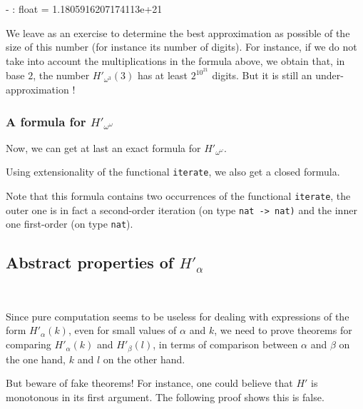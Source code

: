 \begin{Coqanswer}
- : float = 1.1805916207174113e+21
\end{Coqanswer}




We leave as an exercise to determine the best approximation as possible of
 the size of this number (for instance its number of digits).  For instance, if
we do not take into account the multiplications in the formula above,
we obtain that, in base $2$, the number $H'_{\omega^3}(3)$ has at least
$2^{10^{21}}$  digits. But it is still an under-approximation !







\subsubsection{A formula for \texorpdfstring{$H'_{\omega^\omega}$}{\texttt{H'(phi0(omega))}}}
    
Now, we can get at last an exact formula for $H'_{\omega^\omega}$.





Using extensionality of the functional \texttt{iterate}, we also get a closed formula.




Note that this formula contains two occurrences of the functional \texttt{iterate}, the outer one is in fact a second-order iteration (on type \texttt{nat -> nat)}
and the inner one  first-order (on type \texttt{nat}). 


\subsection{Abstract properties of  
\texorpdfstring{$H'_\alpha$}{H'}}
~\label{sect:H-alpha-prop} 

Since pure computation seems to be useless for dealing with expressions of the form $H'_\alpha(k)$, even for small values of $\alpha$ and $k$, we need to prove theorems for comparing $H'_\alpha(k)$ and $H'_\beta(l)$, in terms of comparison
between $\alpha$ and $\beta$ on the one hand, $k$ and $l$ on the other hand.

But beware of fake theorems! For instance, one could believe that $H'$ is monotonous in its first argument. The following proof shows this is false.

